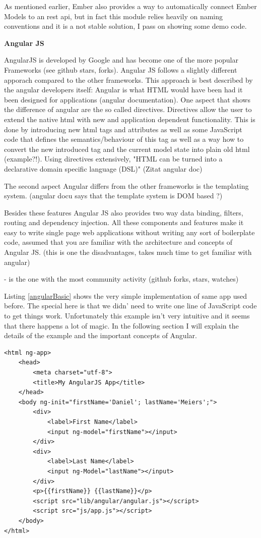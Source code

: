 As mentioned earlier, Ember also provides a way to automatically connect Ember Models to an rest api, but in fact this module relies heavily on naming conventions and it is a not stable solution, I pass on showing some demo code.


\textbf{Angular JS}  

AngularJS is developed by Google and has become one of the more popular Frameworks (see github stars, forks). Angular JS follows a slightly different apporach compared to the other frameworks. This approach is best described by the angular developers itself: Angular is what HTML would have been had it been designed for applications (angular documentation). One aspect that shows the difference of angular are the so called directives. Directives allow the user to extend the native html with new and application dependent functionality.  This is done by introducing new html tags and attributes as well as some JavaScript code that defines the semantics/behaviour of this tag as well as a way how to convert the new introduced tag and the current model state into plain old html (example?!). Using directives extensively, "HTML can be turned into a declarative domain specific language (DSL)" (Zitat angular doc)
  
The second aspect Angular differs from the other frameworks is the templating system. (angular docu says that the template system is DOM based ?)   

Besides these features Angular JS also provides two way data binding, filters, routing and dependency injection. 
All these components and features make it easy to write single page web applications without writing any sort of boilerplate code, assumed that you are familiar with the architecture and concepts of Angular JS. (this is one the disadvantages, takes much time to get familiar with angular)  

- is the one with the most community activity (github forks, stars, watches) 

Listing \ref{angularBasic} shows the very simple implementation of same app used before. The special here is that we didn' need to write one line of JavaScript code to get things work. Unfortunately this example isn't very intuitive and it seems that there happens a lot of magic. In the following section I will explain the details of the example and the important concepts of Angular.

\begin{lstlisting}[label=angularBasic]
<html ng-app>
    <head>
        <meta charset="utf-8">
        <title>My AngularJS App</title>
    </head>
    <body ng-init="firstName='Daniel'; lastName='Meiers';">
        <div>
            <label>First Name</label> 
            <input ng-model="firstName"></input>
        </div>
        <div>
            <label>Last Name</label> 
            <input ng-Model="lastName"></input>
        </div>
        <p>{{firstName}} {{lastName}}</p>
        <script src="lib/angular/angular.js"></script>
        <script src="js/app.js"></script>
    </body>
</html>
\end{lstlisting}


